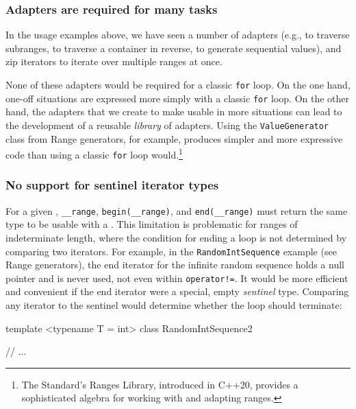 {{{\subsubsection[Adapters are required for many tasks]{Adapters are required for many tasks}\label{adapters-are-required-for-many-tasks}

In the usage examples above, we have seen a number of adapters (e.g., to
traverse subranges, to traverse a container in reverse, to generate
sequential values), and zip iterators to iterate over multiple ranges at
once.

None of these adapters would be required for a classic \lstinline!for!
loop. On the one hand, one-off situations are expressed more simply with
a classic \lstinline!for! loop. On the other hand, the adapters that we
create to make  usable in more
situations can lead to the development of a reusable \emph{library} of
adapters. Using the \lstinline!ValueGenerator! class from {Range
generators}, for example, produces simpler and more expressive code than
using a classic \lstinline!for! loop would.{\cprotect\footnote{The
Standard's Ranges Library, introduced in C++20, provides a
  sophisticated algebra for working with and adapting ranges.}}

\subsubsection[No support for sentinel iterator types]{No support for sentinel iterator types}\label{no-support-for-sentinel-iterator-types}

For a given , \lstinline!__range!,
\lstinline!begin(__range)!, and \lstinline!end(__range)! must return the
same type to be usable with a .
This limitation is problematic for ranges of indeterminate length, where
the condition for ending a loop is not determined by comparing two
iterators. For example, in the \lstinline!RandomIntSequence! example (see
{Range generators}), the end iterator for the infinite random sequence
holds a null pointer and is never used, not even within
\lstinline|operator!=|. It would be more efficient and convenient if the
end iterator were a special, empty \emph{sentinel} type. Comparing any
iterator to the sentinel would determine whether the loop should
terminate:

\begin{emcppslisting}
template <typename T = int>
class RandomIntSequence2
{
    // ...

}
\end{emcppslisting}}}}
